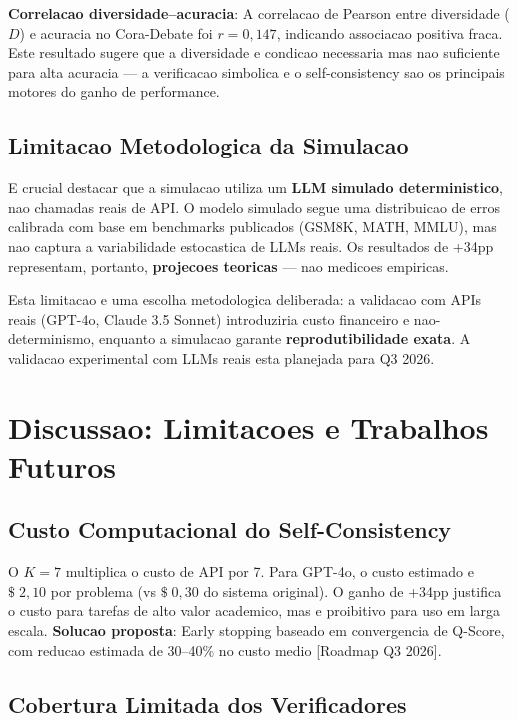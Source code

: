 \documentclass[5p]{elsarticle}
\begin{document}
\textbf{Correlacao diversidade--acuracia}: A correlacao de Pearson entre diversidade ($D$) e acuracia no Cora-Debate foi $r = 0,147$, indicando associacao positiva fraca. Este resultado sugere que a diversidade e condicao necessaria mas nao suficiente para alta acuracia --- a verificacao simbolica e o self-consistency sao os principais motores do ganho de performance.

\subsection{Limitacao Metodologica da Simulacao}

E crucial destacar que a simulacao utiliza um \textbf{LLM simulado deterministico}, nao chamadas reais de API. O modelo simulado segue uma distribuicao de erros calibrada com base em benchmarks publicados (GSM8K, MATH, MMLU), mas nao captura a variabilidade estocastica de LLMs reais. Os resultados de +34pp representam, portanto, \textbf{projecoes teoricas} --- nao medicoes empiricas.

Esta limitacao e uma escolha metodologica deliberada: a validacao com APIs reais (GPT-4o, Claude 3.5 Sonnet) introduziria custo financeiro e nao-determinismo, enquanto a simulacao garante \textbf{reprodutibilidade exata}. A validacao experimental com LLMs reais esta planejada para Q3 2026.

\section{Discussao: Limitacoes e Trabalhos Futuros}

\subsection{Custo Computacional do Self-Consistency}

O $K=7$ multiplica o custo de API por 7. Para GPT-4o, o custo estimado e $\$\;2,10$ por problema (vs $\$\;0,30$ do sistema original). O ganho de +34pp justifica o custo para tarefas de alto valor academico, mas e proibitivo para uso em larga escala. \textbf{Solucao proposta}: Early stopping baseado em convergencia de Q-Score, com reducao estimada de 30--40\% no custo medio [Roadmap Q3 2026].

\subsection{Cobertura Limitada dos Verificadores}
\end{document}
